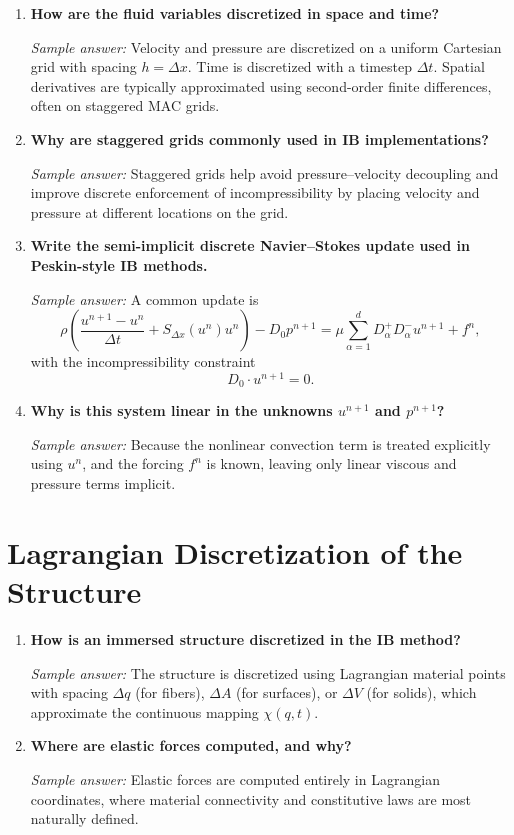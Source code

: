 \documentclass[11pt]{article}
\begin{document}
\begin{enumerate}[label=\arabic*., resume]

\item \textbf{How are the fluid variables discretized in space and time?}

\textit{Sample answer:}  
Velocity and pressure are discretized on a uniform Cartesian grid with spacing $h = \Delta x$. Time is discretized with a timestep $\Delta t$. Spatial derivatives are typically approximated using second-order finite differences, often on staggered MAC grids.

\item \textbf{Why are staggered grids commonly used in IB implementations?}

\textit{Sample answer:}  
Staggered grids help avoid pressure–velocity decoupling and improve discrete enforcement of incompressibility by placing velocity and pressure at different locations on the grid.

\item \textbf{Write the semi-implicit discrete Navier--Stokes update used in Peskin-style IB methods.}

\textit{Sample answer:}  
A common update is
\[
\rho\left(\frac{u^{n+1}-u^n}{\Delta t} + S_{\Delta x}(u^n)u^n\right)
- D_0 p^{n+1}
= \mu \sum_{\alpha=1}^d D^+_\alpha D^-_\alpha u^{n+1} + f^n,
\]
with the incompressibility constraint
\[
D_0 \cdot u^{n+1} = 0.
\]

\item \textbf{Why is this system linear in the unknowns $u^{n+1}$ and $p^{n+1}$?}

\textit{Sample answer:}  
Because the nonlinear convection term is treated explicitly using $u^n$, and the forcing $f^n$ is known, leaving only linear viscous and pressure terms implicit.

\end{enumerate}

\section*{Lagrangian Discretization of the Structure}

\begin{enumerate}[label=\arabic*., resume]

\item \textbf{How is an immersed structure discretized in the IB method?}

\textit{Sample answer:}  
The structure is discretized using Lagrangian material points with spacing $\Delta q$ (for fibers), $\Delta A$ (for surfaces), or $\Delta V$ (for solids), which approximate the continuous mapping $\chi(q,t)$.

\item \textbf{Where are elastic forces computed, and why?}

\textit{Sample answer:}  
Elastic forces are computed entirely in Lagrangian coordinates, where material connectivity and constitutive laws are most naturally defined.

\end{enumerate}
\end{document}

